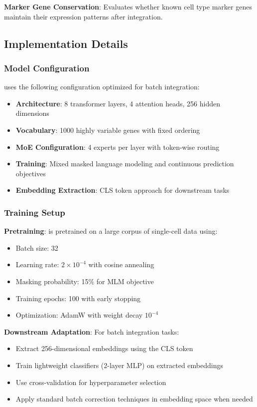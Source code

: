\textbf{Marker Gene Conservation}: Evaluates whether known cell type marker genes maintain their expression patterns after integration.

\subsection{Implementation Details}

\subsubsection{Model Configuration}

\bioformer{} uses the following configuration optimized for batch integration:

\begin{itemize}
\item \textbf{Architecture}: 8 transformer layers, 4 attention heads, 256 hidden dimensions
\item \textbf{Vocabulary}: 1000 highly variable genes with fixed ordering
\item \textbf{MoE Configuration}: 4 experts per layer with token-wise routing
\item \textbf{Training}: Mixed masked language modeling and continuous prediction objectives
\item \textbf{Embedding Extraction}: CLS token approach for downstream tasks
\end{itemize}

\subsubsection{Training Setup}

\textbf{Pretraining}: \bioformer{} is pretrained on a large corpus of single-cell data using:
\begin{itemize}
\item Batch size: 32
\item Learning rate: $2 \times 10^{-4}$ with cosine annealing
\item Masking probability: 15\% for MLM objective
\item Training epochs: 100 with early stopping
\item Optimization: AdamW with weight decay $10^{-4}$
\end{itemize}

\textbf{Downstream Adaptation}: For batch integration tasks:
\begin{itemize}
\item Extract 256-dimensional embeddings using the CLS token
\item Train lightweight classifiers (2-layer MLP) on extracted embeddings
\item Use cross-validation for hyperparameter selection
\item Apply standard batch correction techniques in embedding space when needed
\end{itemize}


